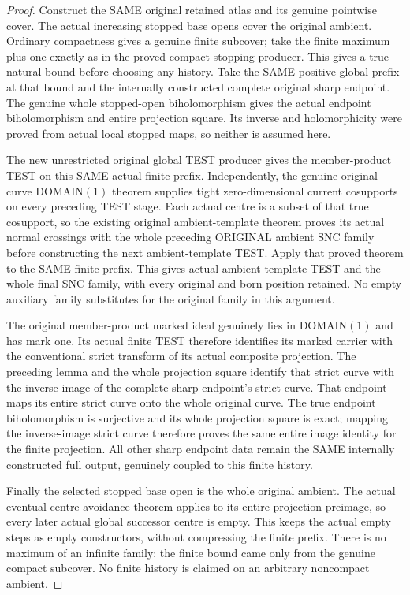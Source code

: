 \begin{proof}
Construct the SAME original retained atlas and its genuine pointwise cover.
The actual increasing stopped base opens cover the original ambient.
Ordinary compactness gives a genuine finite subcover; take the finite
maximum plus one exactly as in the proved compact stopping producer.
This gives a true natural bound before choosing any history. Take the
SAME positive global prefix at that bound and the internally constructed
complete original sharp endpoint. The genuine whole stopped-open
biholomorphism gives the actual endpoint biholomorphism and entire
projection square. Its inverse and holomorphicity were proved from actual
local stopped maps, so neither is assumed here.

The new unrestricted original global TEST producer gives the member-product
TEST on this SAME actual finite prefix. Independently, the genuine original
curve DOMAIN$(1)$ theorem supplies tight zero-dimensional current
cosupports on every preceding TEST stage. Each actual centre is a subset
of that true cosupport, so the existing original ambient-template theorem
proves its actual normal crossings with the whole preceding ORIGINAL
ambient SNC family before constructing the next ambient-template TEST.
Apply that proved theorem to the SAME finite prefix. This gives actual
ambient-template TEST and the whole final SNC family, with every original
and born position retained. No empty auxiliary family substitutes for the
original family in this argument.

The original member-product marked ideal genuinely lies in DOMAIN$(1)$
and has mark one. Its actual finite TEST therefore identifies its marked
carrier with the conventional strict transform of its actual composite
projection. The preceding lemma and the whole projection square identify
that strict curve with the inverse image of the complete sharp endpoint's
strict curve. That endpoint maps its entire strict curve onto the whole
original curve. The true endpoint biholomorphism is surjective and its
whole projection square is exact; mapping the inverse-image strict curve
therefore proves the same entire image identity for the finite projection.
All other sharp endpoint data remain the SAME internally constructed full
output, genuinely coupled to this finite history.

Finally the selected stopped base open is the whole original ambient.
The actual eventual-centre avoidance theorem applies to its entire
projection preimage, so every later actual global successor centre is
empty. This keeps the actual empty steps as empty constructors, without
compressing the finite prefix. There is no maximum of an infinite family:
the finite bound came only from the genuine compact subcover. No finite
history is claimed on an arbitrary noncompact ambient.
\end{proof}
